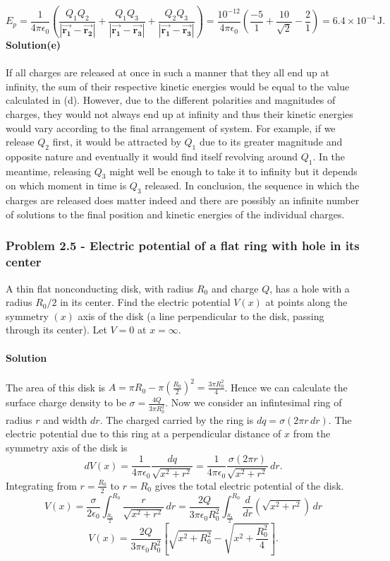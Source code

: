 \documentclass{article}
\begin{document}
\[E_p=\frac{1}{4\pi\epsilon_0}\left(\frac{Q_1Q_2}{|\boldsymbol{\Vec{r_1}}-\boldsymbol{\Vec{r_2}}|}+\frac{Q_1Q_3}{|\boldsymbol{\Vec{r_1}}-\boldsymbol{\Vec{r_3}}|}+\frac{Q_2Q_3}{|\boldsymbol{\Vec{r_1}}-\boldsymbol{\Vec{r_3}}|}\right)=\frac{10^{-12}}{4\pi\epsilon_0}\left(\frac{-5}{1}+\frac{10}{\sqrt{2}}-\frac{2}{1}\right)=6.4\times10^{-4}\,\text{J}.\]
\textbf{Solution(e)}
\\
\\If all charges are released at once in such a manner that they all end up at infinity, the sum of their respective kinetic energies would be equal to the value calculated in (d). However, due to the different polarities and magnitudes of charges, they would not always end up at infinity and thus their kinetic energies would vary according to the final arrangement of system. For example, if we release $Q_2$ first, it would be attracted by $Q_1$ due to its greater magnitude and opposite nature and eventually it would find itself revolving around $Q_1$. In the meantime, releasing $Q_3$ might well be enough to take it to infinity but it depends on which moment in time is $Q_3$ released. In conclusion, the sequence in which the charges are released does matter indeed and there are possibly an infinite number of solutions to the final position and kinetic energies of the individual charges.

\subsubsection*{Problem 2.5 - Electric potential of a flat ring with hole in its center}
A thin flat nonconducting disk, with radius $R_0$ and charge
$Q$, has a hole with a radius $R_0/2$ in its center. Find the electric potential $V(x)$ at points along the symmetry $(x)$ axis of
the disk (a line perpendicular to the disk, passing through its
center). Let $V = 0$ at $x = \infty$.
\\
\\\textbf{Solution}
\\
\\The area  of this disk is $A=\pi R_0-\pi\left(\frac{R_0}{2}\right)^2=\frac{3\pi R_0^2}{4}$. Hence we can calculate the surface charge density to be $\sigma=\frac{4Q}{3\pi R_0^2}$. Now we consider an infintesimal ring of radius $r$ and width $dr$. The charged carried by the ring is $dq=\sigma(2\pi r\,dr)$. The electric potential due to this ring at a perpendicular distance of $x$ from the symmetry axis of the disk is 
\[dV(x)=\frac{1}{4\pi\epsilon_0}\frac{dq}{\sqrt{x^2+r^2}}=\frac{1}{4\pi\epsilon_0}\frac{\sigma(2\pi r)}{\sqrt{x^2+r^2}}\,dr.\]
Integrating from $r=\frac{R_0}{2}$ to $r=R_0$ gives the total electric potential of the disk.
\[V(x)=\frac{\sigma}{2\epsilon_0}\int_{\frac{R_0}{2}}^{R_0}\frac{r}{\sqrt{x^2+r^2}}\,dr=\frac{2Q}{3\pi\epsilon_0R_0^2}\int_{\frac{R_0}{2}}^{R_0}\frac{d}{dr}\left(\sqrt{x^2+r^2}\right)\,dr\]
\[V(x)=\frac{2Q}{3\pi\epsilon_0R_0^2}\left[\sqrt{x^2+R_0^2}-\sqrt{x^2+\frac{R_0^2}{4}}\right].\]
\end{document}
